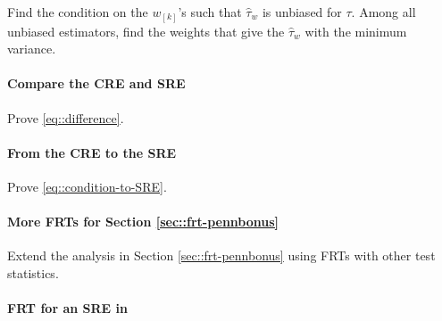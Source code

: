 Find the condition on the $w_{[k]}$'s such that $\hat{\tau}_w $ is unbiased for $\tau$. Among all unbiased estimators, find the weights that give the $\hat{\tau}_w$ with the minimum variance. 


\paragraph{Compare the CRE and SRE}\label{hw::compare-CRE-SRE}

Prove \eqref{eq::difference}.



\paragraph{From the CRE to the SRE}\label{hw::CRE-SRE}


Prove \eqref{eq::condition-to-SRE}.


 
 \paragraph{More FRTs for Section \ref{sec::frt-pennbonus}}\label{hw::FRT-SRE-more}
 
 Extend the analysis in Section \ref{sec::frt-pennbonus} using FRTs with other test statistics.


 
 \paragraph{FRT for an SRE in \citet{imbens2015causal}}


